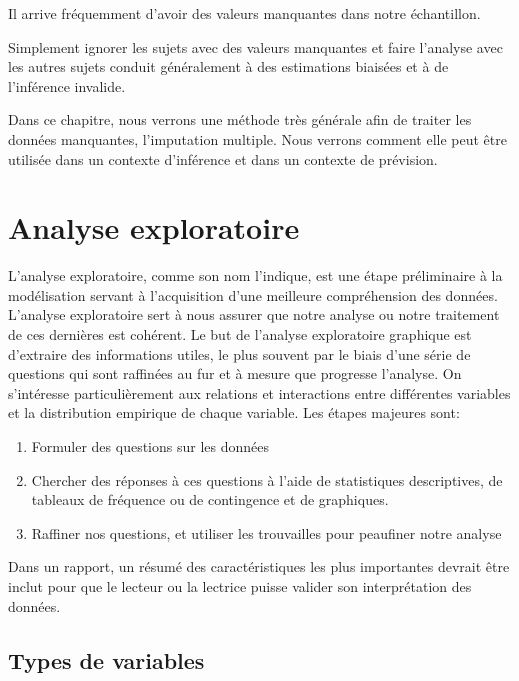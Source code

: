 \documentclass[
  11pt,
  letterpaper,
]{book}
\providecommand{\tightlist}{%
  \setlength{\itemsep}{0pt}\setlength{\parskip}{0pt}}\usepackage{longtable,booktabs,array}
\theoremstyle{definition}
\theoremstyle{remark}
\begin{document}
Il arrive fréquemment d'avoir des valeurs manquantes dans notre
échantillon.

Simplement ignorer les sujets avec des valeurs manquantes et faire
l'analyse avec les autres sujets conduit généralement à des estimations
biaisées et à de l'inférence invalide.

Dans ce chapitre, nous verrons une méthode très générale afin de traiter
les données manquantes, l'imputation multiple. Nous verrons comment elle
peut être utilisée dans un contexte d'inférence et dans un contexte de
prévision.


\hypertarget{analyse-exploratoire}{%
\chapter{Analyse exploratoire}\label{analyse-exploratoire}}

L'analyse exploratoire, comme son nom l'indique, est une étape
préliminaire à la modélisation servant à l'acquisition d'une meilleure
compréhension des données. L'analyse exploratoire sert à nous assurer
que notre analyse ou notre traitement de ces dernières est cohérent. Le
but de l'analyse exploratoire graphique est d'extraire des informations
utiles, le plus souvent par le biais d'une série de questions qui sont
raffinées au fur et à mesure que progresse l'analyse. On s'intéresse
particulièrement aux relations et interactions entre différentes
variables et la distribution empirique de chaque variable. Les étapes
majeures sont:

\begin{enumerate}
\def\labelenumi{\arabic{enumi}.}
\tightlist
\item
  Formuler des questions sur les données
\item
  Chercher des réponses à ces questions à l'aide de statistiques
  descriptives, de tableaux de fréquence ou de contingence et de
  graphiques.
\item
  Raffiner nos questions, et utiliser les trouvailles pour peaufiner
  notre analyse
\end{enumerate}

Dans un rapport, un résumé des caractéristiques les plus importantes
devrait être inclut pour que le lecteur ou la lectrice puisse valider
son interprétation des données.

\hypertarget{types-de-variables}{%
\section{Types de variables}\label{types-de-variables}}
\end{document}
